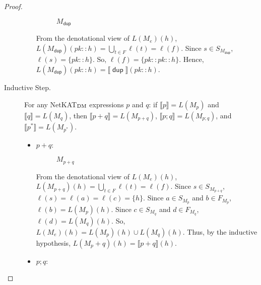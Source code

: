 \documentclass{article}
\newcommand\den[1]{\llbracket #1\rrbracket}
\newcommand\pdup{\mathop{\mathsf{dup}}}
\renewcommand\star{^{\textstyle *}}
\begin{document}
\begin{proof}
\begin{description}
\begin{itemize}
\begin{figure}[H]
    \caption{$M_{\pdup}$}
  \end{figure}
  
  From the denotational view of $L(M_e)(h)$,
  $L(M_{\pdup})(pk::h) = \bigcup_{t\in F}\ell(t) = \ell(f)$. Since 
  $s \in S_{M_{\pdup}}$, $\ell(s) = \{pk::h\}$. So, 
  $\ell(f) = \{pk::pk::h\}$. Hence, 
  $L(M_{\pdup})(pk::h) = \den{\pdup}(pk::h)$.
\end{itemize}
  
\item[Inductive Step.] For any NetKAT$_{\textnormal{DM}}$ expressions $p$ and 
$q$: if $\den{p} = L(M_{p})$ and $\den{q} = L(M_{q})$, then 
$\den{p+q} = L(M_{p+q})$, $\den{p;q} = L(M_{p;q})$, and
$\den{p\star} = L(M_{p\star})$.

\begin{itemize}
  \item $p+q$:
  \begin{figure}[H]
    \centering
    \caption{$M_{p+q}$}
  \end{figure}
  
  From the denotational view of $L(M_e)(h)$,
  $L(M_{p+q})(h) = \bigcup_{t\in F}\ell(t) = \ell(f)$. Since 
  $s \in S_{M_{p+q}}$, $\ell(s) = \ell(a) = \ell(c) = \{h\}$. Since 
  $a \in S_{M_p}$ and $b \in F_{M_p}$, $\ell(b) = L(M_p)(h)$. Since 
  $c \in S_{M_q}$ and $d \in F_{M_q}$, $\ell(d) = L(M_q)(h)$. So, 
  $L(M_e)(h) = L(M_p)(h) \cup L(M_q)(h)$. Thus, by the inductive hypothesis,
  $L(M_p+q)(h) = \den{p+q}(h)$. 
  
  \item $p;q$:
  \begin{figure}[H]
    \centering
\end{figure}
\end{itemize}
\end{description}
\end{proof}
\end{document}
